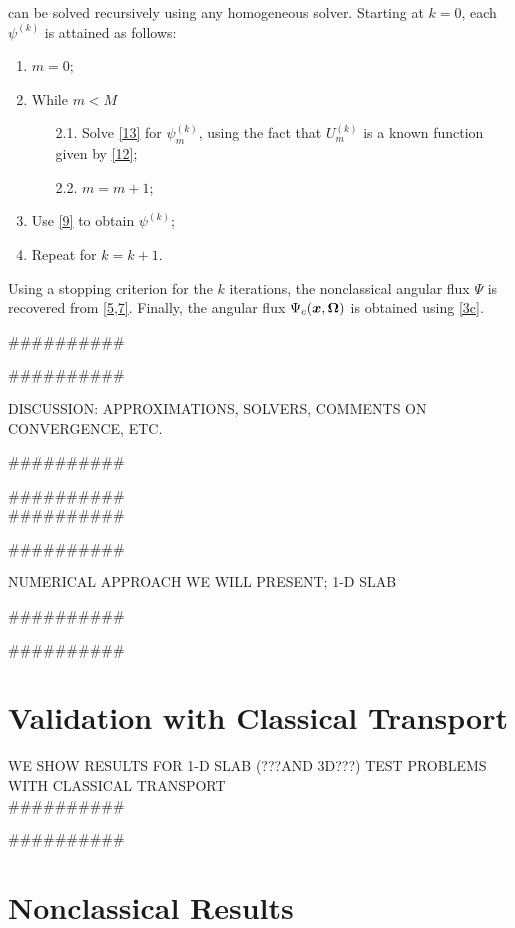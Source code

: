 \documentclass[preprint,12pt]{elsarticle}
\newcommand{\ux}{{\bm x}}
\newcommand{\uom}{{\bf \Omega}}
\begin{document}
 can be solved recursively using any homogeneous solver.
Starting at $k=0$, each $\psi^{(k)}$ is attained as follows:  
\begin{enumerate}
\item $m=0$;
\item While $m < M$
\begin{itemize}
\item[2.1.] Solve \cref{13} for $\psi_m^{(k)}$, using the fact that $U_m^{(k)}$ is a known function given by \cref{12};
\item[2.2.] $m=m+1$;
\end{itemize}
\item Use \cref{9} to obtain $\psi^{(k)}$;
\item Repeat for $k=k+1$.
\end{enumerate}
Using a stopping criterion for the $k$ iterations, the nonclassical angular flux $\Psi$ is recovered from \cref{5,7}.
Finally, the angular flux $\Psi_c(\ux,\uom)$ is obtained using \cref{3c}.   

\#\#\#\#\#\#\#\#\#\#

\#\#\#\#\#\#\#\#\#\#

DISCUSSION: APPROXIMATIONS, SOLVERS, COMMENTS ON CONVERGENCE, ETC.

\#\#\#\#\#\#\#\#\#\#

\#\#\#\#\#\#\#\#\#\# 
\\

\#\#\#\#\#\#\#\#\#\#

\#\#\#\#\#\#\#\#\#\# 

NUMERICAL APPROACH WE WILL PRESENT; 1-D SLAB 

\#\#\#\#\#\#\#\#\#\#

\#\#\#\#\#\#\#\#\#\# 

\section{Validation with Classical Transport}\label{sec4}
\setcounter{section}{4}

WE SHOW RESULTS FOR 1-D SLAB (???AND 3D???) TEST PROBLEMS WITH CLASSICAL TRANSPORT\\

\#\#\#\#\#\#\#\#\#\#

\#\#\#\#\#\#\#\#\#\#


\section{Nonclassical Results}\label{sec5}
\setcounter{section}{5}
\end{document}
